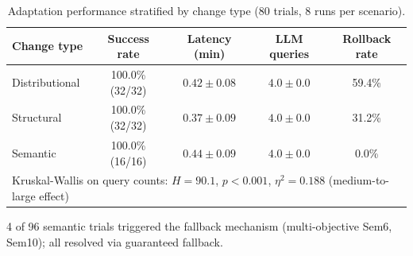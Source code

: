 \begin{table}[h]
\centering
\caption{Adaptation performance stratified by change type (80 trials, 8 runs per scenario).}
\label{tab:hierarchy}
\small
\begin{threeparttable}
\begin{tabular}{@{}lcccc@{}}
\toprule
Change type & Success rate & Latency (min) & LLM queries & Rollback rate \\
\midrule
Distributional & 100.0\% (32/32) & $0.42\pm0.08$ & $4.0\pm0.0$ & 59.4\% \\
Structural & 100.0\% (32/32) & $0.37\pm0.09$ & $4.0\pm0.0$ & 31.2\% \\
Semantic & 100.0\% (16/16)\tnote{a} & $0.44\pm0.09$ & $4.0\pm0.0$ & 0.0\% \\
\midrule
\multicolumn{5}{l}{\footnotesize Kruskal-Wallis on query counts: $H=90.1$, $p<0.001$, $\eta^2=0.188$ (medium-to-large effect)} \\
\bottomrule
\end{tabular}
\begin{tablenotes}
\footnotesize
\item[a] 4 of 96 semantic trials triggered the fallback mechanism (multi-objective Sem6, Sem10); all resolved via guaranteed fallback.
\end{tablenotes}
\end{threeparttable}
\end{table}